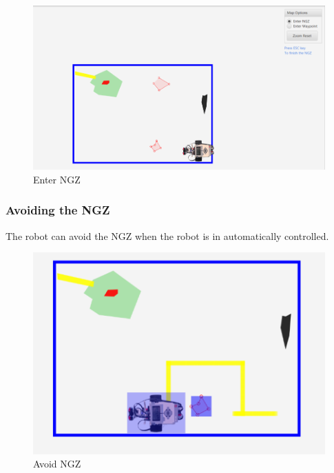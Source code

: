 \documentclass[10pt,a4paper,titlepage]{article}
\begin{document}
  \begin{figure}[H] 
  \includegraphics[width=\linewidth]{enterngz.png}  %
  \caption{Enter NGZ} 
  \label{fig:Enter NGZ}               
  \end{figure} 
 
  \subsubsection{Avoiding the NGZ} 
The robot can avoid the NGZ when the robot is in automatically controlled.
  \begin{figure}[H] 
  \includegraphics[width=\linewidth]{avoidngz.png}  %
  \caption{Avoid NGZ} 
  \label{fig:Avoid NGZ}               
  \end{figure} 
   
\end{document}
